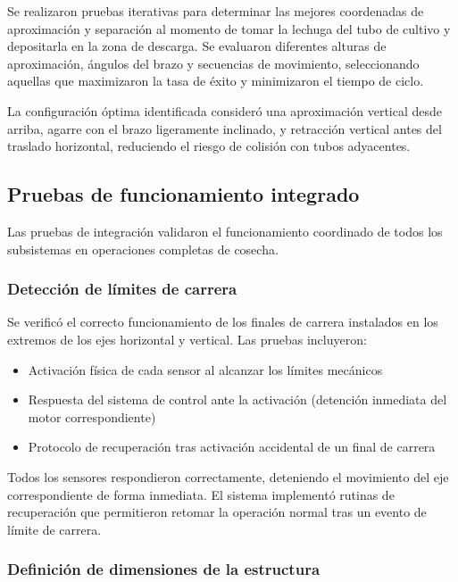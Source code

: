 Se realizaron pruebas iterativas para determinar las mejores coordenadas de aproximación y separación al momento de tomar la lechuga del tubo de cultivo y depositarla en la zona de descarga. Se evaluaron diferentes alturas de aproximación, ángulos del brazo y secuencias de movimiento, seleccionando aquellas que maximizaron la tasa de éxito y minimizaron el tiempo de ciclo.

La configuración óptima identificada consideró una aproximación vertical desde arriba, agarre con el brazo ligeramente inclinado, y retracción vertical antes del traslado horizontal, reduciendo el riesgo de colisión con tubos adyacentes.

\subsection{Pruebas de funcionamiento integrado}

Las pruebas de integración validaron el funcionamiento coordinado de todos los subsistemas en operaciones completas de cosecha.

\subsubsection{Detección de límites de carrera}

Se verificó el correcto funcionamiento de los finales de carrera instalados en los extremos de los ejes horizontal y vertical. Las pruebas incluyeron:

\begin{itemize}
    \item Activación física de cada sensor al alcanzar los límites mecánicos
    \item Respuesta del sistema de control ante la activación (detención inmediata del motor correspondiente)
    \item Protocolo de recuperación tras activación accidental de un final de carrera
\end{itemize}

Todos los sensores respondieron correctamente, deteniendo el movimiento del eje correspondiente de forma inmediata. El sistema implementó rutinas de recuperación que permitieron retomar la operación normal tras un evento de límite de carrera.

\subsubsection{Definición de dimensiones de la estructura}


